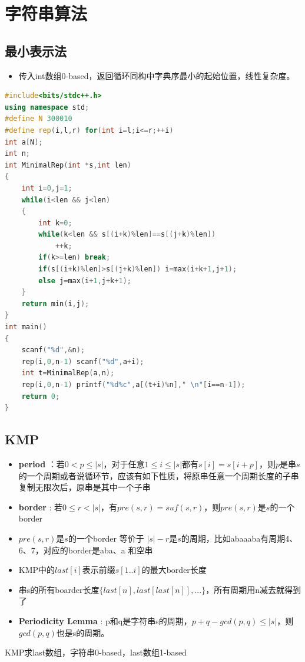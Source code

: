 \documentclass[UTF8,a4paper,titlepage]{ctexart}
\begin{document}
\section{字符串算法}
\subsection{最小表示法}
\begin{itemize}
	\item 传入int数组0-based，返回循环同构中字典序最小的起始位置，线性复杂度。
\end{itemize}
\begin{lstlisting}[language=C++]
#include<bits/stdc++.h>
using namespace std;
#define N 300010
#define rep(i,l,r) for(int i=l;i<=r;++i)
int a[N];
int n;
int MinimalRep(int *s,int len)
{
    int i=0,j=1;
    while(i<len && j<len)
    {
        int k=0;
        while(k<len && s[(i+k)%len]==s[(j+k)%len])
            ++k;
        if(k>=len) break;
        if(s[(i+k)%len]>s[(j+k)%len]) i=max(i+k+1,j+1);
        else j=max(i+1,j+k+1);
    }
    return min(i,j);
}
int main()
{
    scanf("%d",&n);
    rep(i,0,n-1) scanf("%d",a+i);
    int t=MinimalRep(a,n);
    rep(i,0,n-1) printf("%d%c",a[(t+i)%n]," \n"[i==n-1]);
    return 0;
}
\end{lstlisting}
\subsection{KMP}
\begin{itemize}
	\item \textbf{period} ：若$0<p\le \left|s\right|$，对于任意$1 \le i\le \left|s\right|$都有$s[i]=s[i+p]$，则$p$是串$s$的一个周期或者说循环节，应该有如下性质，将原串任意一个周期长度的子串复制无限次后，原串是其中一个子串
	\item \textbf{border} : 若$0\le r< \left|s\right|$，有$pre(s,r)=suf(s,r)$，则$pre(s,r)$是$s$的一个border
	\item $pre(s,r)$是$s$的一个border 等价于 $\left|s\right|-r$是$s$的周期，比如abaaaba有周期4、6、7，对应的border是aba、a 和空串
	\item KMP中的$last[i]$表示前缀$s[1..i]$的最大border长度
	\item 串s的所有boarder长度$\{last[n],last[last[n]],...\}$，所有周期用n减去就得到了
	\item \textbf{Periodicity Lemma} : p和q是字符串s的周期，$p+q-gcd(p,q)\le\left|s\right|$，则$gcd(p,q)$也是s的周期。
\end{itemize}

KMP求last数组，字符串0-based，last数组1-based
\end{document}
